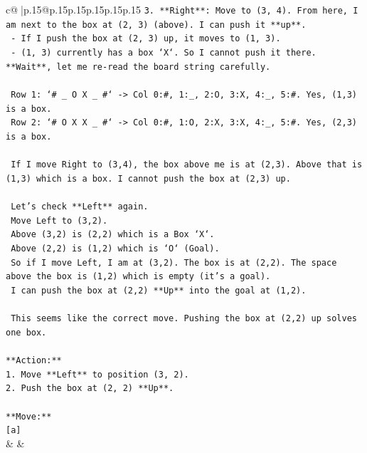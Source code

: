 \documentclass{article}
\begin{document}
{\begin{supertabular}{c@{$\;$}|p{.15\linewidth}@{}p{.15\linewidth}p{.15\linewidth}p{.15\linewidth}p{.15\linewidth}p{.15\linewidth}}
{{{\texttt{3.  **Right**: Move to (3, 4). From here, I am next to the box at (2, 3) (above). I can push it **up**.} \\
\texttt{    {-} If I push the box at (2, 3) up, it moves to (1, 3).} \\
\texttt{    {-} (1, 3) currently has a box `X`. So I cannot push it there. **Wait**, let me re{-}read the board string carefully.} \\
\\ 
\texttt{    Row 1: `\# \_ O X \_ \#` {-}> Col 0:\#, 1:\_, 2:O, 3:X, 4:\_, 5:\#. Yes, (1,3) is a box.} \\
\texttt{    Row 2: `\# O X X \_ \#` {-}> Col 0:\#, 1:O, 2:X, 3:X, 4:\_, 5:\#. Yes, (2,3) is a box.} \\
\\ 
\texttt{    If I move Right to (3,4), the box above me is at (2,3). Above that is (1,3) which is a box. I cannot push the box at (2,3) up.} \\
\\ 
\texttt{    Let's check **Left** again.} \\
\texttt{    Move Left to (3,2).} \\
\texttt{    Above (3,2) is (2,2) which is a Box `X`.} \\
\texttt{    Above (2,2) is (1,2) which is `O` (Goal).} \\
\texttt{    So if I move Left, I am at (3,2). The box is at (2,2). The space above the box is (1,2) which is empty (it's a goal).} \\
\texttt{    I can push the box at (2,2) **Up** into the goal at (1,2).} \\
\\ 
\texttt{    This seems like the correct move. Pushing the box at (2,2) up solves one box.} \\
\\ 
\texttt{**Action:**} \\
\texttt{1.  Move **Left** to position (3, 2).} \\
\texttt{2.  Push the box at (2, 2) **Up**.} \\
\\ 
\texttt{**Move:**} \\
\texttt{{[}a{]}} \\
            }
        }
    }
    & & \\ \\


\end{supertabular}}
\end{document}
